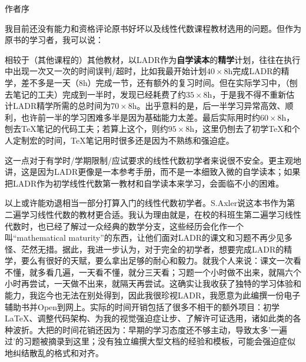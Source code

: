 \centerline{\Large 作者序}\vspace{6pt}\par
{\small 我目前还没有能力和资格评论原书好坏以及线性代数课程教材选用的问题。但作为原书的学习者，我可以说：\par\vspace{2pt}
相较于（其他课程的）其他教材，以LADR作为\textbf{自学读本}的\textbf{精学}计划，往往在执行中出现一次又一次的时间误判/超时，{\footnotesize 比如我最开始计划$40\times 8$h完成LADR的精学，差不多是一天（$8$h）完成一节，还有额外的复习时间。但在实际学习中，（刨去笔记的工夫）完成到一半时，发现已经耗费了约$35\times 8$h，于是我不得不重新估计LADR精学所需的总时间为$70\times 8$h。出乎意料的是，后一半学习异常高效、\!顺利，也许前一半的学习困难多半是因为基础能力太差。最后实际用时约$60\times 8$h，刨去\TeX 笔记的代码工夫；若算上这个，则约$95\times 8$h，这里仍刨去了初学\TeX 和个人定制宏的时间，\TeX 笔记用时很多还是因为不熟练和强迫症。}\par\vspace{4pt}
这一点对于有学时/学期限制/应试要求的线性代数初学者来说很不安全。更主观地讲，这是因为LADR更像是一本参考手册，而不是一本细致入微的自学读本；如果把LADR作为初学线性代数第一教材和自学读本来学习，会面临不小的困难。\par\vspace{4pt}
以上或许能劝退相当一部分打算入门的线性代数初学者。S.Axler说这本书作为第二遍学习线性代数的教材更合适。我认为理由就是，在校的科班生第二遍学习线性代数时，也已经了解过一众经典的数学分支，这些经历会化作一个叫“mathematical maturity”的东西，让他们面对LADR的课文和习题不再少见多怪、茫然无措。据此，我进一步认为，对于完全的初学者，想要完成LADR的精学，要么有很好的天赋，要么拿出足够的耐心和毅力。就我个人来说：课文一次看不懂，就多看几遍，一天看不懂，就分三天看；习题一个小时做不出来，就隔六个小时再尝试，一天做不出来，就隔天再尝试。这确实让我收获了独特的学习体验和能力，我迄今也无法在别处得到，因此我很珍视LADR，我愿意为此编撰一份电子辅助书并Open到网上。{\footnotesize 实际的时间开销包括了很多不相干的额外项目：初学\LaTeX、\!调整代码架构、\!为我的视觉强迫症让步、\!了解许可证选用，诸如此类的各种波折。大把的时间花销还因为：早期的学习态度还不够主动，导致太多'一遍过'的习题被摘录到这里；没有独立编撰大型文档的经验和模板，可能会强迫症似地纠结散乱的格式和对齐。}\par\vspace{4pt}
}
